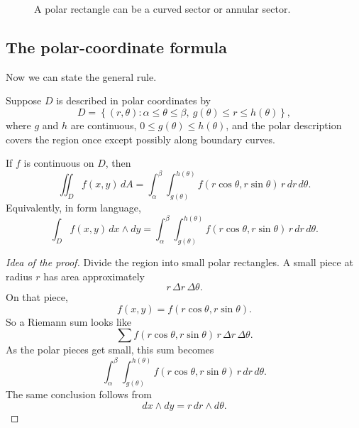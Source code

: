 \begin{figure}[h]
\centering
{}
\caption{A polar rectangle can be a curved sector or annular sector.}
\end{figure}

\subsection{The polar-coordinate formula}

Now we can state the general rule.

\begin{theorem}
Suppose \(D\) is described in polar coordinates by
\[
    D=
    \left\{
        (r,\theta):
        \alpha\le\theta\le\beta,\ 
        g(\theta)\le r\le h(\theta)
    \right\},
\]
where \(g\) and \(h\) are continuous, \(0\le g(\theta)\le h(\theta)\), and the polar
description covers the region once except possibly along boundary curves.

If \(f\) is continuous on \(D\), then
\[
\boxed{
    \iint_D f(x,y)\,dA
    =
    \int_\alpha^\beta
    \int_{g(\theta)}^{h(\theta)}
    f(r\cos\theta,r\sin\theta)\,r\,dr\,d\theta.
}
\]
Equivalently, in form language,
\[
\boxed{
    \int_D f(x,y)\,dx\wedge dy
    =
    \int_\alpha^\beta
    \int_{g(\theta)}^{h(\theta)}
    f(r\cos\theta,r\sin\theta)\,r\,dr\,d\theta.
}
\]
\end{theorem}

\begin{proof}[Idea of the proof]
Divide the region into small polar rectangles.  A small piece at radius \(r\) has area
approximately
\[
    r\,\Delta r\,\Delta\theta.
\]
On that piece,
\[
    f(x,y)=f(r\cos\theta,r\sin\theta).
\]
So a Riemann sum looks like
\[
    \sum
    f(r\cos\theta,r\sin\theta)\,r\,\Delta r\,\Delta\theta.
\]
As the polar pieces get small, this sum becomes
\[
    \int_\alpha^\beta
    \int_{g(\theta)}^{h(\theta)}
    f(r\cos\theta,r\sin\theta)\,r\,dr\,d\theta.
\]
The same conclusion follows from
\[
    dx\wedge dy=r\,dr\wedge d\theta.
\]
\end{proof}

